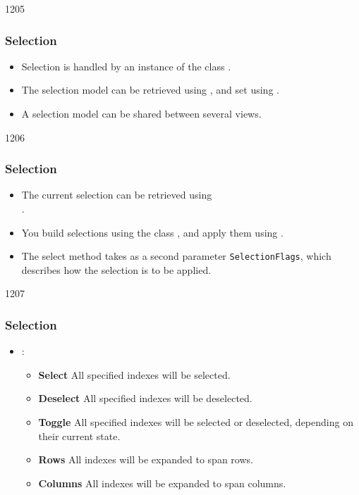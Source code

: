\begin{slide}{1205}\frametitle{Selection}\label{model_view_selection}
\begin{itemize}
\item Selection is handled by an instance of the class
  .
\item The selection model can be retrieved using
  , and set using
  .
\item A selection model can be shared between several views.
\end{itemize}
\end{slide}

\begin{slide}{1206}\frametitle{Selection}
\begin{itemize}
\item The current selection can be retrieved using\\
  .
\item You build selections using the class , and
  apply them using .
\item The select method takes as a second parameter
  \texttt{SelectionFlags}, which describes how the selection is to be
  applied.
\end{itemize}
\end{slide}

\begin{slide}{1207}\frametitle{Selection}
\begin{itemize}
\item {}:
\begin{itemize}
\item \textbf{Select} All specified indexes will be selected.
\item \textbf{Deselect} All specified indexes will be deselected.
\item \textbf{Toggle} All specified indexes will be selected or deselected, depending on their current state.\\

\item \textbf{Rows} All indexes will be expanded to span rows.
\item \textbf{Columns} All indexes will be expanded to span columns.\\
\end{itemize}
\end{itemize}
\end{slide}

